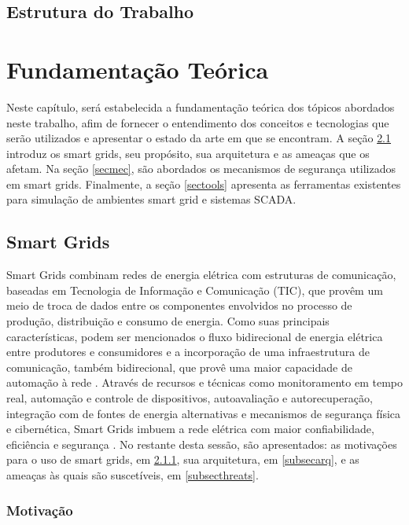 \documentclass[cic,tc]{iiufrgs}
\begin{document}
\section{Estrutura do Trabalho}
\chapter{Fundamentação Teórica}
Neste capítulo, será estabelecida a fundamentação teórica dos tópicos abordados neste trabalho, afim de fornecer o entendimento dos conceitos e tecnologias que serão utilizados e apresentar o estado da arte em que se encontram. A seção \ref{secsg} introduz os smart grids, seu propósito, sua arquitetura e as ameaças que os afetam. Na seção \ref{secmec}, são abordados os mecanismos de segurança utilizados em smart grids. Finalmente, a seção \ref{sectools} apresenta as ferramentas existentes para simulação de ambientes smart grid e sistemas SCADA.

\section{Smart Grids}
\label{secsg}
Smart Grids combinam redes de energia elétrica com estruturas de comunicação, baseadas em Tecnologia de Informação e Comunicação (TIC), que provêm um meio de troca de dados entre os componentes envolvidos no processo de produção, distribuição e consumo de energia. Como suas principais características, podem ser mencionados o fluxo bidirecional de energia elétrica entre produtores e consumidores e a incorporação de uma infraestrutura de comunicação, também bidirecional, que provê uma maior capacidade de automação à rede \cite{2013survey}. Através de recursos e técnicas como monitoramento em tempo real, automação e controle de dispositivos, autoavaliação e autorecuperação, integração com de fontes de energia alternativas e mecanismos de segurança física e cibernética, Smart Grids imbuem a rede elétrica com maior confiabilidade, eficiência e segurança \cite{li2012securing}.
No restante desta sessão, são apresentados: as motivações para o uso de smart grids, em \ref{subsecmotiv}, sua arquitetura, em \ref{subsecarq}, e as ameaças às quais são suscetíveis, em \ref{subsecthreats}.

\subsection{Motivação}
\label{subsecmotiv}
\end{document}

